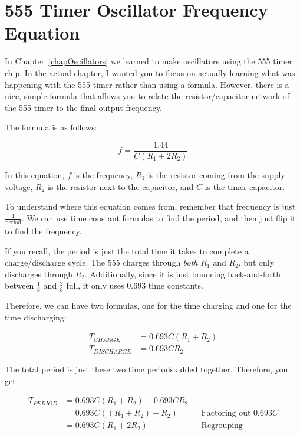 
\section{555 Timer Oscillator Frequency Equation}
\label{apOscillatorFreq}

In Chapter~\ref{chapOscillators} we learned to make oscillators using the 555 timer chip.
In the actual chapter, I wanted you to focus on actually learning what was happening with the 555 timer rather than using a formula.
However, there is a nice, simple formula that allows you to relate the resistor/capacitor network of the 555 timer to the final output frequency.

The formula is as follows:

\begin{equation}
f = \frac{1.44}{C(R_1 + 2 R_2)}
\end{equation}

In this equation, $f$ is the frequency, $R_1$ is the resistor coming from the supply voltage, $R_2$ is the resistor next to the capacitor, and $C$ is the timer capacitor.

To understand where this equation comes from, remember that frequency is just $\frac{1}{\textrm{period}}$.
We can use time constant formulas to find the period, and then just flip it to find the frequency.

If you recall, the period is just the total time it takes to complete a charge/discharge cycle.  
The 555 charges through \emph{both} $R_1$ and $R_2$, but only discharges through $R_2$.
Additionally, since it is just bouncing back-and-forth between $\frac{1}{3}$ and $\frac{2}{3}$ full, it only uses $0.693$ time constants.

Therefore, we can have two formulas, one for the time charging and one for the time discharging:

\begin{align*}
T_{CHARGE} &= 0.693 C (R_1 + R_2) \\
T_{DISCHARGE} &= 0.693 C R_2
\end{align*}

The total period is just these two time periods added together.
Therefore, you get:

\begin{align*}
T_{PERIOD} &= 0.693 C (R_1 + R_2) + 0.693 C R_2 \\
 &= 0.693 C((R_1 + R_2) + R_2) && \textrm{Factoring out $0.693 C$} \\
 &= 0.693 C(R_1 + 2 R_2) && \textrm{Regrouping}
\end{align*}

